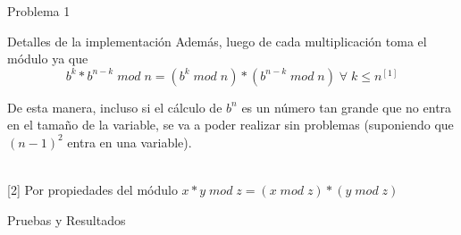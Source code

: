 \begin{section}{Problema 1}
\begin{subsection}{Detalles de la implementación}
\noindent Además, luego de cada multiplicación toma el módulo ya que
 $$b^k * b^{n-k}\; mod\;n = (b^k\;mod\;n)*(b^{n-k}\;mod\;n)\;\forall\;k\leq n ^{[1]}$$

De esta manera, incluso si el cálculo de $b^n$ es un número tan grande que no entra en el tamaño de la variable, se va a poder realizar sin problemas (suponiendo que $(n-1)^2$ entra en una variable).





\vspace{0.5cm}
 \\
{\footnotesize [2] Por propiedades del módulo $x*y\; mod \; z = (x\; mod\; z)*(y\; mod\; z)$ } \\


	\end{subsection}

	\begin{subsection}{Pruebas y Resultados}

	\end{subsection}

\end{section}

